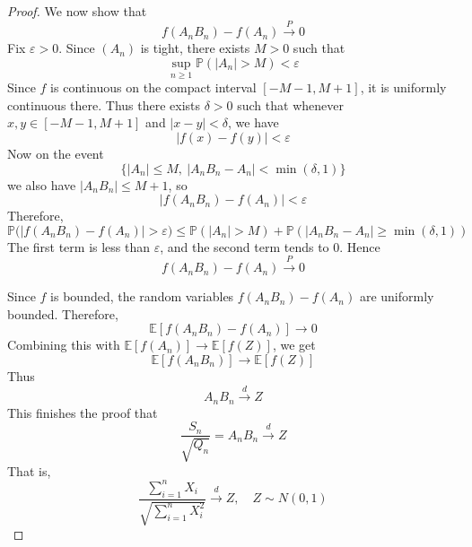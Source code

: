 \begin{proof}
We now show that
\[
f(A_nB_n)-f(A_n)\xrightarrow{P}0
\]
Fix $\varepsilon>0$. Since $(A_n)$ is tight, there exists $M>0$ such that
\[
\sup_{n\ge 1}\mathbb P(|A_n|>M)<\varepsilon
\]
Since $f$ is continuous on the compact interval $[-M-1,M+1]$, it is uniformly continuous there. Thus there
exists $\delta>0$ such that whenever $x,y\in[-M-1,M+1]$ and $|x-y|<\delta$, 
we have
\[
|f(x)-f(y)|<\varepsilon
\]
Now on the event
\[
\{|A_n|\le M,\ |A_nB_n-A_n|<\min(\delta,1)\}
\]
we also have $|A_nB_n|\le M+1$, so
\[
|f(A_nB_n)-f(A_n)|<\varepsilon
\]
Therefore,
\[
\mathbb P\bigl(|f(A_nB_n)-f(A_n)|>\varepsilon\bigr)
\le
\mathbb P(|A_n|>M)+\mathbb P(|A_nB_n-A_n|\ge \min(\delta,1))
\]
The first term is less than $\varepsilon$, 
and the second term tends to $0$. Hence
\[
f(A_nB_n)-f(A_n)\xrightarrow{P}0
\]

Since $f$ is bounded, the random variables $f(A_nB_n)-f(A_n)$ are uniformly 
bounded. Therefore,
\[
\mathbb E[f(A_nB_n)-f(A_n)]\to 0
\]
Combining this with
\(
\mathbb E[f(A_n)]\to \mathbb E[f(Z)]
\), 
we get
\[
\mathbb E[f(A_nB_n)]\to \mathbb E[f(Z)]
\]
Thus
\[
A_nB_n\xrightarrow{d}Z
\]
This finishes the proof that 
\[
\frac{S_n}{\sqrt{Q_n}}
=
A_nB_n
\xrightarrow{d} Z
\]
That is,
\[
\frac{\sum_{i=1}^n X_i}{\sqrt{\sum_{i=1}^n X_i^2}}
\xrightarrow{d} Z,
\quad Z\sim N(0,1)
\]
\end{proof}